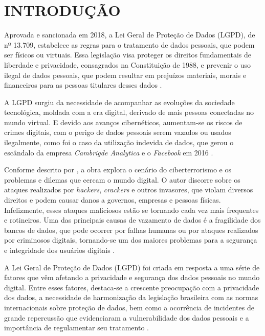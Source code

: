 \documentclass[
	12pt,				%
	openright,			%
	oneside,			%
	a4paper,			%
	english,			%
	french,				%
	spanish,			%
	brazil,				%
	]{abntex2}
\begin{document}
\chapter*{INTRODUÇÃO}
\label{chapter:introducao}
Aprovada e sancionada em 2018, a Lei Geral de Proteção de Dados (LGPD), de nº 13.709, estabelece as regras para o tratamento de dados pessoais, que podem ser físicos ou virtuais. Essa legislação visa proteger os direitos fundamentais de liberdade e privacidade, consagrados na Constituição de 1988, e prevenir o uso ilegal de dados pessoais, que podem resultar em prejuízos materiais, morais e financeiros para as pessoas titulares desses dados \cite{01-01-LeiGeral}. 

A LGPD surgiu da necessidade de acompanhar as evoluções da sociedade tecnológica, moldada com a era digital, derivado de mais pessoas conectadas no mundo virtual. E devido aos avanços cibernéticos, aumentam-se os riscos de crimes digitais, com o perigo de dados pessoais serem vazados ou usados ilegalmente, como foi o caso da utilização indevida de dados, que gerou o escândalo da empresa \textit{Cambrigde Analytica} e o \textit{Facebook} em 2016 \cite{01-03-OlharDigital}. 

Conforme descrito por , a obra explora o cenário do ciberterrorismo e os problemas e dilemas que cercam o mundo digital. O autor discorre sobre os ataques realizados por \textit{hackers}, \textit{crackers} e outros invasores,  que violam diversos direitos e podem causar danos a governos, empresas e pessoas físicas. Infelizmente, esses ataques maliciosos estão se tornando cada vez mais frequentes e rotineiros. Uma das principais causas de vazamento de dados é a fragilidade dos bancos de dados, que pode ocorrer por falhas humanas ou por ataques realizados por criminosos digitais, tornando-se um dos maiores problemas para a segurança e integridade dos usuários digitais \cite{01-06-Dodsworth2021}.

A Lei Geral de Proteção de Dados (LGPD) foi criada em resposta a uma série de fatores que vêm afetando a privacidade e segurança dos dados pessoais no mundo digital. Entre esses fatores, destaca-se a crescente preocupação com a privacidade dos dados, a necessidade de harmonização da legislação brasileira com as normas internacionais sobre proteção de dados, bem como a ocorrência de incidentes de grande repercussão que evidenciaram a vulnerabilidade dos dados pessoais e a importância de regulamentar seu tratamento \cite{01-02-Senado}.
\end{document}

